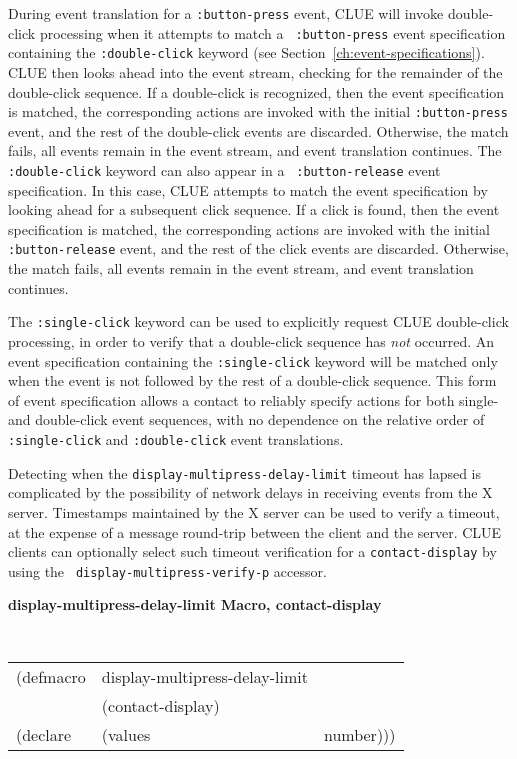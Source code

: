 During event translation for a {\tt :button-press} event, CLUE will
invoke double-click processing when it attempts to match a {\tt
:button-press} event specification
containing the {\tt :double-click} keyword (see
Section~\ref{ch:event-specifications}).  CLUE then
looks ahead into the event stream, checking for the remainder of the
double-click sequence. If a double-click is recognized, then the event
specification is matched, the corresponding actions are invoked with the
initial {\tt :button-press} event, and the rest of the double-click
events are discarded. Otherwise, the match fails, all events remain in
the event stream, and event translation continues.
The {\tt :double-click} keyword can also appear in a {\tt
:button-release} event specification. In this case, CLUE attempts to
match the event specification by looking ahead for
a subsequent click sequence. If a click is found, then the event
specification is matched, the corresponding actions are invoked with the
initial {\tt :button-release} event, and the rest of the click
events are discarded. Otherwise, the match fails, all events remain in
the event stream, and event translation continues.

The {\tt :single-click} keyword can be used to explicitly request CLUE
double-click processing, in order to verify that a double-click sequence
has {\em not} occurred. An event specification containing the
{\tt :single-click} keyword will be matched only when the event is not
followed by the rest of a
double-click sequence. This form of event specification allows a contact
to reliably specify actions for both single- and double-click event
sequences, with no dependence on the relative order of {\tt
:single-click} and {\tt :double-click} event translations.

Detecting when the {\tt display-multipress-delay-limit} timeout has lapsed is
complicated by the possibility of network delays in
receiving events from the X server. 
Timestamps maintained by the X server can be used to verify a timeout, at
the expense of a message round-trip between the client and
the server. CLUE clients can optionally select such timeout
verification for a {\tt contact-display} by using the {\tt
display-multipress-verify-p} accessor.


{\samepage
{\large {\bf display-multipress-delay-limit \hfill Macro, contact-display}} 
\begin{flushright} \parbox[t]{6.125in}{
\tt
\begin{tabular}{lll}
\raggedright
(defmacro & display-multipress-delay-limit & \\ 
& (contact-display) \\
(declare &(values  & number)))
\end{tabular}
\rm

}\end{flushright}}

